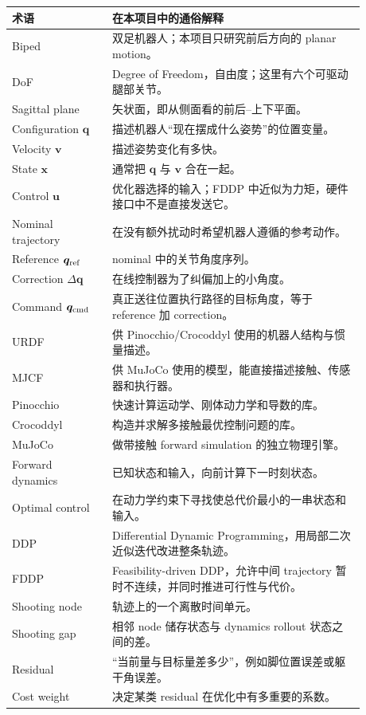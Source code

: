 \documentclass[UTF8,11pt,a4paper]{ctexart}
\begin{document}
\begin{longtable}{@{}p{0.25\linewidth}p{0.63\linewidth}@{}}
\toprule
术语 & 在本项目中的通俗解释 \\
\midrule
\endhead
Biped & 双足机器人；本项目只研究前后方向的 planar motion。\\
DoF & Degree of Freedom，自由度；这里有六个可驱动腿部关节。\\
Sagittal plane & 矢状面，即从侧面看的前后--上下平面。\\
Configuration $\bm q$ & 描述机器人“现在摆成什么姿势”的位置变量。\\
Velocity $\bm v$ & 描述姿势变化有多快。\\
State $\bm x$ & 通常把 $\bm q$ 与 $\bm v$ 合在一起。\\
Control $\bm u$ & 优化器选择的输入；FDDP 中近似为力矩，硬件接口中不是直接发送它。\\
Nominal trajectory & 在没有额外扰动时希望机器人遵循的参考动作。\\
Reference $\bm q_{\rm ref}$ & nominal 中的关节角度序列。\\
Correction $\Delta\bm q$ & 在线控制器为了纠偏加上的小角度。\\
Command $\bm q_{\rm cmd}$ & 真正送往位置执行路径的目标角度，等于 reference 加 correction。\\
URDF & 供 Pinocchio/Crocoddyl 使用的机器人结构与惯量描述。\\
MJCF & 供 MuJoCo 使用的模型，能直接描述接触、传感器和执行器。\\
Pinocchio & 快速计算运动学、刚体动力学和导数的库。\\
Crocoddyl & 构造并求解多接触最优控制问题的库。\\
MuJoCo & 做带接触 forward simulation 的独立物理引擎。\\
Forward dynamics & 已知状态和输入，向前计算下一时刻状态。\\
Optimal control & 在动力学约束下寻找使总代价最小的一串状态和输入。\\
DDP & Differential Dynamic Programming，用局部二次近似迭代改进整条轨迹。\\
FDDP & Feasibility-driven DDP，允许中间 trajectory 暂时不连续，并同时推进可行性与代价。\\
Shooting node & 轨迹上的一个离散时间单元。\\
Shooting gap & 相邻 node 储存状态与 dynamics rollout 状态之间的差。\\
Residual & “当前量与目标量差多少”，例如脚位置误差或躯干角误差。\\
Cost weight & 决定某类 residual 在优化中有多重要的系数。\\

\end{longtable}
\end{document}
